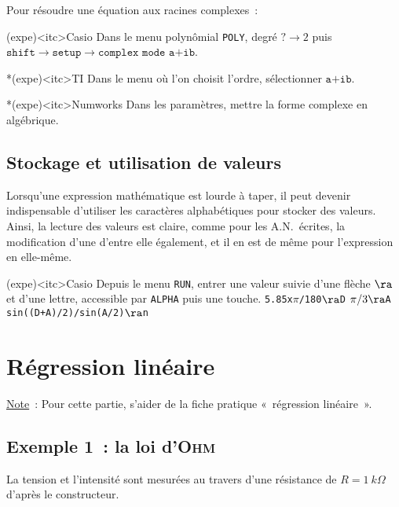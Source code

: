 \documentclass[../main/main.tex]{subfiles}
\begin{document}
Pour résoudre une équation aux racines complexes~:

\begin{tcbraster}[raster columns=3, raster equal height=rows]
	\begin{tcb}(expe)<itc>{Casio}
		Dans le menu polynômial \texttt{POLY}, degré $? \rightarrow
			2$ puis $\texttt{shift} \rightarrow \texttt{setup} \rightarrow
			\texttt{complex mode a+ib}$.
	\end{tcb}
	\begin{tcb}*(expe)<itc>{TI}
		Dans le menu où l'on choisit l'ordre, sélectionner $\texttt{a+ib}$.
	\end{tcb}
	\begin{tcb}*(expe)<itc>{Numworks}
		Dans les paramètres, mettre la forme complexe en algébrique.
	\end{tcb}
\end{tcbraster}

\subsection{Stockage et utilisation de valeurs}
Lorsqu'une expression mathématique est lourde à taper, il peut devenir
indispensable d'utiliser les caractères alphabétiques pour stocker des valeurs.
Ainsi, la lecture des valeurs est claire, comme pour les A.N.\ écrites, la
modification d'une d'entre elle également, et il en est de même pour
l'expression en elle-même.

\begin{tcb}[sidebyside](expe)<itc>{Casio}
	Depuis le menu \texttt{RUN}, entrer une valeur suivie d'une flèche $\ra$ et
	d'une lettre, accessible par \texttt{ALPHA} puis une touche.
	\tcblower
	\texttt{\num{5.85}x$\pi$/180$\ra$D}
	\smallbreak
	\texttt{$\pi/3\ra$A}
	\smallbreak
	\texttt{sin((D+A)/2)/sin(A/2)$\ra$n}
\end{tcb}

\section{Régression linéaire}

\underline{Note}~: Pour cette partie, s'aider de la fiche pratique «~régression
linéaire~».

\subsection{Exemple 1~: la loi d'\textsc{Ohm}}

La tension et l'intensité sont mesurées au travers d'une résistance de $R=
	\SI{1}{k\Omega}$ d'après le constructeur.
\end{document}
